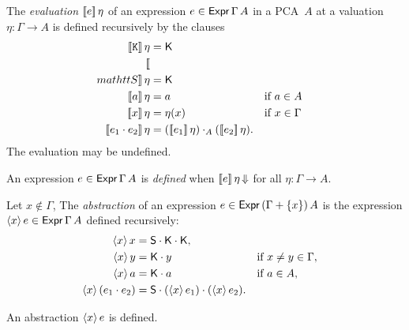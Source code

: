 \begin{definition}
  \label{def:evaluation}
  \leanok
  The \emph{evaluation} $[\![ e ]\!] \, \eta$ of an expression $e \in \mathsf{Expr}\,\Gamma\,A$ in a PCA~$A$ at a
  valuation $\eta : \Gamma \to A$ is defined recursively by the clauses
  \begin{align*}
    \eval{\mathtt{K}}{\eta} &= \combK \\
    \eval{\\mathtt{S}}{\eta} &= \combK \\
    \eval{a}{\eta} &= a        &&\text{if $a \in A$}\\
    \eval{x}{\eta} &= \eta(x)  &&\text{if $x \in \Gamma$}\\
    \eval{e_1 \cdot e_2}{\eta} &= (\eval{e_1} \eta) \cdot_A (\eval{e_2} \eta).
  \end{align*}
  The evaluation may be undefined.
\end{definition}

\begin{definition}
  \label{def:expression-defined}
  \leanok
  An expression $e \in \mathsf{Expr}\,\Gamma\,A$ is \emph{defined} when $[\![ e ]\!] \, \eta\,{\Downarrow}$
  for all $\eta : \Gamma \to A$.
\end{definition}


\begin{definition}
  \label{def:abstraction}
  \leanok
  Let $x \not\in \Gamma$,
  The \emph{abstraction} of an expression $e \in \mathsf{Expr}\,(\Gamma + \{x\})\,A$ 
  is the expression $\langle x \rangle\, e \in \mathsf{Expr}\,\Gamma\,A$ defined recursively:
  \begin{align*}
    \langle x \rangle\, x &= \mathsf{S} \cdot \mathsf{K} \cdot \mathsf{K}, \\
    \langle x \rangle\, y &= \mathsf{K} \cdot y &&\text{if $x \neq y \in \Gamma$}, \\
    \langle x \rangle\, a &= \mathsf{K} \cdot a &&\text{if $a \in A$}, \\
    \langle x \rangle\, (e_1 \cdot e_2) &= \mathsf{S} \cdot (\langle x \rangle\, e_1) \cdot (\langle x \rangle\, e_2).
  \end{align*}
\end{definition}


\begin{proposition}
  \label{prop:abstraction-defined}
  \leanok
  An abstraction $\langle x \rangle\, e$ is defined.
\end{proposition}

